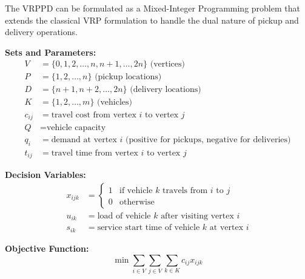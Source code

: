 \documentclass{article}
\begin{document}
The VRPPD can be formulated as a Mixed-Integer Programming problem that extends the classical VRP formulation to handle the dual nature of pickup and delivery operations.

\textbf{Sets and Parameters:}
\begin{align}
V &= \{0, 1, 2, \ldots, n, n+1, \ldots, 2n\} \text{ (vertices)} \\
P &= \{1, 2, \ldots, n\} \text{ (pickup locations)} \\
D &= \{n+1, n+2, \ldots, 2n\} \text{ (delivery locations)} \\
K &= \{1, 2, \ldots, m\} \text{ (vehicles)} \\
c_{ij} &= \text{travel cost from vertex } i \text{ to vertex } j \\
Q &= \text{vehicle capacity} \\
q_i &= \text{demand at vertex } i \text{ (positive for pickups, negative for deliveries)} \\
t_{ij} &= \text{travel time from vertex } i \text{ to vertex } j
\end{align}

\textbf{Decision Variables:}
\begin{align}
x_{ijk} &= \begin{cases} 1 & \text{if vehicle } k \text{ travels from } i \text{ to } j \\ 0 & \text{otherwise} \end{cases} \\
u_{ik} &= \text{load of vehicle } k \text{ after visiting vertex } i \\
s_{ik} &= \text{service start time of vehicle } k \text{ at vertex } i
\end{align}

\textbf{Objective Function:}
\begin{equation}
\min \sum_{i \in V} \sum_{j \in V} \sum_{k \in K} c_{ij} x_{ijk}
\end{equation}
\end{document}
